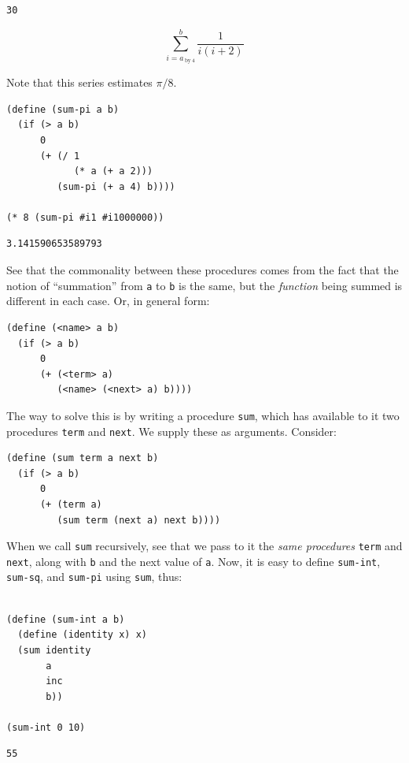 \documentclass[9pt]{report}
\begin{document}
\begin{verbatim}
30
\end{verbatim}


$$\sum_{i=a_{\mathrm{~by~}4}}^{b} \frac{1}{i(i+2)}$$

Note that this series estimates \(\pi /8\).

\begin{verbatim}
(define (sum-pi a b)
  (if (> a b)
      0
      (+ (/ 1
            (* a (+ a 2)))
         (sum-pi (+ a 4) b))))

(* 8 (sum-pi #i1 #i1000000))
\end{verbatim}

\begin{verbatim}
3.141590653589793
\end{verbatim}



See that the commonality between these procedures comes from the
fact that the notion of ``summation'' from \texttt{a} to \texttt{b} is the same,
but the \emph{function} being summed is different in each case. Or, in
general form:

\begin{verbatim}
(define (<name> a b)
  (if (> a b)
      0
      (+ (<term> a)
         (<name> (<next> a) b))))
\end{verbatim}

The way to solve this is by writing a procedure \texttt{sum}, which has
available to it two procedures \texttt{term} and \texttt{next}. We supply these
as arguments. Consider:

\begin{verbatim}
(define (sum term a next b)
  (if (> a b)
      0
      (+ (term a)
         (sum term (next a) next b))))
\end{verbatim}

When we call \texttt{sum} recursively, see that we pass to it the \emph{same
procedures} \texttt{term} and \texttt{next}, along with \texttt{b} and the next value of
\texttt{a}. Now, it is easy to define \texttt{sum-int}, \texttt{sum-sq}, and \texttt{sum-pi}
using \texttt{sum}, thus:

\begin{verbatim}

(define (sum-int a b)
  (define (identity x) x)
  (sum identity
       a
       inc
       b))

(sum-int 0 10)
\end{verbatim}

\begin{verbatim}
55
\end{verbatim}
\end{document}
